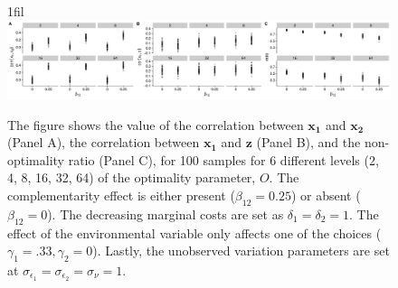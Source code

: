 \documentclass[12pt]{article}
\makeatletter
\newcommand*{\centerfloat}{%
  \parindent \z@
  \leftskip \z@ \@plus 1fil \@minus \textwidth
  \rightskip\leftskip
  \parfillskip \z@skip}
\makeatother
\begin{document}
\begin{figure}
\centerfloat
\includegraphics[width=450px]{figure-latex/sample_descriptives.pdf}
\caption[Calibration of Simulated Samples]{\label{calibration} The figure shows the value of the correlation between $\mathbf{x_1}$ and $\mathbf{x_2}$ (Panel A), the correlation between $\mathbf{x_1}$ and $\mathbf{z}$ (Panel B), and the non-optimality ratio (Panel C),  for 100 samples for 6 different levels (2, 4, 8, 16, 32, 64) of the optimality parameter, $O$. The complementarity effect is either present ($\beta_{12} = 0.25$) or absent ($\beta_{12} = 0$). The decreasing marginal costs are set as $\delta_1 = \delta_2 = 1$. The effect of the environmental variable only affects one of the choices
($\gamma_1 = .33, \gamma_2 = 0$). Lastly, the unobserved variation parameters are set at $\sigma_{\epsilon_1} = \sigma_{\epsilon_2} = \sigma_{\nu} = 1.$}
\end{figure}
\end{document}
